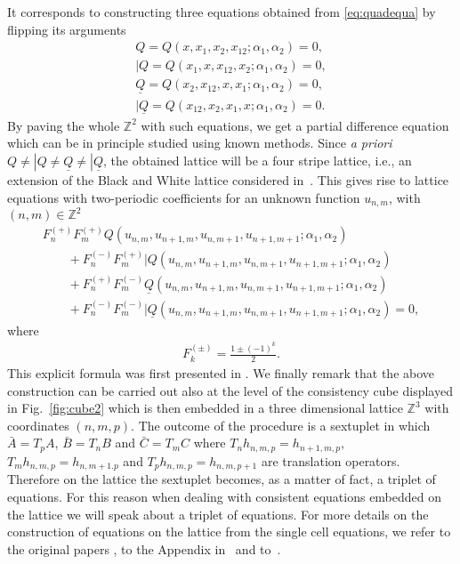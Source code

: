 \documentclass[pdftex]{sigma}
\numberwithin{equation}{section}
\newcommand{\Z}{\mathbb{Z}}
\newcommand{\Fp}[1]{F^{(+)}_{#1}}
\newcommand{\Fm}[1]{F^{(-)}_{#1}}
\newcommand{\Fppp}{\Fp{n}\Fp{m}}
\newcommand{\Fpmm}{\Fp{n}\Fm{m}}
\newcommand{\Fmpm}{\Fm{n}\Fp{m}}
\newcommand{\Fmmp}{\Fm{n}\Fm{m}}
\begin{document}
It corresponds to constructing three equations obtained from \eqref{eq:quadequa} by f\/lipping its arguments
 \begin{gather*}
 Q =Q(x,x_{1},x_{2},x_{12};\alpha_{1},\alpha_{2}) =0, \\
 |Q =Q(x_{1},x,x_{12},x_{2};\alpha_{1},\alpha_{2}) =0, \\
 \underline{Q} = Q(x_{2},x_{12},x,x_{1};\alpha_{1},\alpha_{2}) =0, \\
 |\underline{Q} = Q(x_{12},x_{2},x_{1},x;\alpha_{1},\alpha_{2}) =0.
 \end{gather*}
By paving the whole $\Z^{2}$ with such equations, we
get a partial dif\/ference equation which can be in
principle studied using known methods.
Since \emph{a priori}
$Q\neq |Q \neq \underline{Q} \neq |\underline{Q}$,
the obtained lattice will be a four stripe lattice, i.e., an extension of the Black and White
lattice considered in~\cite{ABS2009,HietarintaViallet2012,Xenitidis2009}. This gives rise to lattice equations with two-periodic
coef\/f\/icients for an unknown function $u_{n,m}$, with $(n,m)\in\Z^{2}$
\begin{gather}
\Fppp Q(u_{n,m},u_{n+1,m},u_{n,m+1},u_{n+1,m+1};\alpha_{1},\alpha_{2})\nonumber \\
\qquad{}+\Fmpm|Q (u_{n,m},u_{n+1,m},u_{n,m+1},u_{n+1,m+1};\alpha_{1},\alpha_{2})\nonumber \\
\qquad{}+\Fpmm\underline{Q} (u_{n,m},u_{n+1,m},u_{n,m+1},u_{n+1,m+1};\alpha_{1},\alpha_{2})\nonumber \\
\qquad{}+\Fmmp|\underline{Q} (u_{n,m},u_{n+1,m},u_{n,m+1},u_{n+1,m+1};\alpha_{1},\alpha_{2}) =0, \label{eq:dysys3}
\end{gather}
where
\begin{gather}
 F_{k}^{(\pm)} = \frac{1\pm\left( -1 \right)^{k}}{2}. \label{eq:fk}
\end{gather}
This explicit formula was f\/irst presented in \cite{GSL_Gallipoli15}.
We f\/inally remark that the above construction can be
carried out also at the level of the consistency cube displayed
in Fig.~\ref{fig:cube2} which is then embedded in a three dimensional
lattice $\Z^{3}$ with coordinates $ ( n,m,p )$.
The outcome of the procedure is a sextuplet in which
$\bar{A}=T_{p}A$, $\bar{B}=T_{n}B$ and $\bar{C}=T_{m}C$
where $T_n h_{n,m,p}=h_{n+1,m,p}$, $T_m h_{n,m,p}=h_{n,m+1.p}$ and
$T_{p} h_{n,m,p}=h_{n,m,p+1}$ are translation operators.
Therefore on the lattice the sextuplet becomes, as a matter of fact,
a triplet of equations.
For this reason when dealing with consistent equations embedded
on the lattice we will speak about a triplet of equations.
For more details on the construction of equations on the lattice
from the single cell equations,
we refer to the original papers \cite{Boll2011,Boll2012a,Boll2012b, Xenitidis2009},
to the Appendix in~\cite{GSL_general} and to~\cite{GubbiottiPhD2017}.
\end{document}
